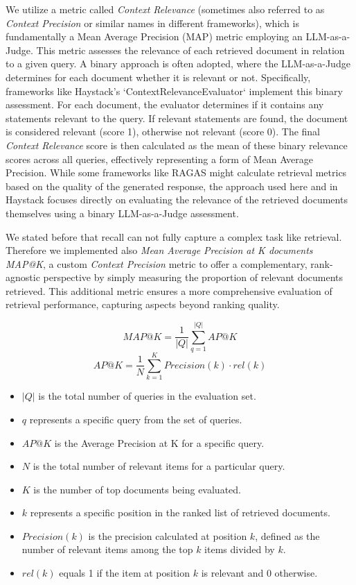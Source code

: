 We utilize a metric called \textit{Context Relevance} (sometimes also referred to as \textit{Context Precision} or similar names in different frameworks), which is fundamentally a Mean Average Precision (MAP) metric employing an LLM-as-a-Judge. This metric assesses the relevance of each retrieved document in relation to a given query. A binary approach is often adopted, where the LLM-as-a-Judge determines for each document whether it is relevant or not. Specifically, frameworks like Haystack's `ContextRelevanceEvaluator`\cite{Pietsch_Haystack_the_end-to-end_2019} implement this binary assessment. For each document, the evaluator determines if it contains any statements relevant to the query. If relevant statements are found, the document is considered relevant (score 1), otherwise not relevant (score 0). The final \textit{Context Relevance} score is then calculated as the mean of these binary relevance scores across all queries, effectively representing a form of Mean Average Precision. While some frameworks like RAGAS might calculate retrieval metrics based on the quality of the generated response, the approach used here and in Haystack focuses directly on evaluating the relevance of the retrieved documents themselves using a binary LLM-as-a-Judge assessment.

We stated before that recall can not fully capture a complex task like retrieval. Therefore we implemented also \textit{Mean Average Precision at K documents MAP@K}, a custom \textit{Context Precision} metric to offer a complementary, rank-agnostic perspective by simply measuring the proportion of relevant documents retrieved. This additional metric ensures a more comprehensive evaluation of retrieval performance, capturing aspects beyond ranking quality.\cite{EvidentlyAIInc..25.02.2025} 

$$MAP@K=\frac{1}{|Q|}\sum_{q=1}^{|Q|}AP@K$$
$$AP@K=\frac{1}{N}\sum_{k=1}^{K}Precision(k) \cdot rel(k)$$
\begin{itemize}
  \item $|Q|$ is the total number of queries in the evaluation set.
  \item $q$ represents a specific query from the set of queries.
  \item $AP@K$ is the Average Precision at K for a specific query.
  \item $N$ is the total number of relevant items for a particular query.
  \item $K$ is the number of top documents being evaluated.
  \item $k$ represents a specific position in the ranked list of retrieved documents.
  \item $Precision(k)$ is the precision calculated at position $k$, defined as the number of relevant items among the top $k$ items divided by $k$.
  \item $rel(k)$ equals 1 if the item at position $k$ is relevant and 0 otherwise.
\end{itemize}

